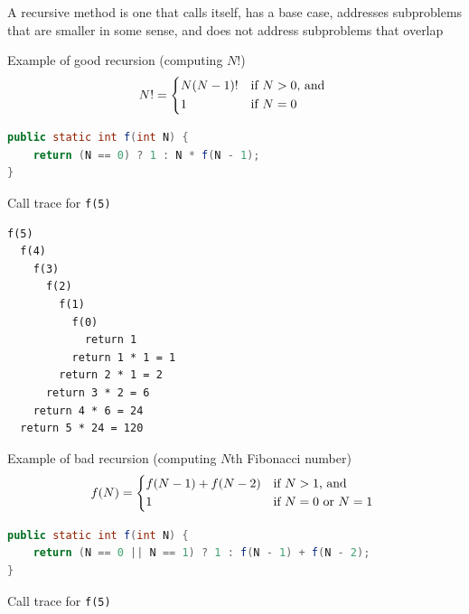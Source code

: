 \documentclass[8pt,a4paper,compress]{beamer}
\begin{document}
\begin{frame}[fragile]
\pause

A recursive method is one that calls itself, has a base case, addresses subproblems that are smaller in some sense, and does not address subproblems that overlap

\pause\bigskip

Example of good recursion (computing $N!$)
\[
N! = \begin{dcases*}
N(N-1)! & if $N > 0$, and \\
1       & if $N=0$
\end{dcases*}
\]

\smallskip

\begin{lstlisting}[language=Java,style=focusin]
public static int f(int N) {
    return (N == 0) ? 1 : N * f(N - 1); 
}
\end{lstlisting}

\pause\bigskip

Call trace for \lstinline{f(5)}

\smallskip

\begin{lstlisting}[language={},style=focusin]
f(5)
  f(4)
    f(3)
      f(2)
        f(1)
          f(0)
            return 1
          return 1 * 1 = 1            
        return 2 * 1 = 2
      return 3 * 2 = 6
    return 4 * 6 = 24
  return 5 * 24 = 120
\end{lstlisting}
\end{frame}

\begin{frame}[fragile]
\pause

Example of bad recursion (computing $N$th Fibonacci number)
\[
f(N) = \begin{dcases*}
f(N-1) + f(N-2) & if $N > 1$, and \\
1       & if $N=0$ or $N=1$
\end{dcases*}
\]

\smallskip

\begin{lstlisting}[language=Java,style=focusin]
public static int f(int N) {
    return (N == 0 || N == 1) ? 1 : f(N - 1) + f(N - 2); 
}
\end{lstlisting}

\pause\bigskip

Call trace for \lstinline{f(5)}
\begin{center}
\end{center}
\end{frame}
\end{document}
